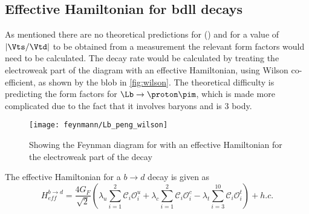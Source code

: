 
\subsection{Effective Hamiltonian for b\to dll decays} %
As mentioned there are no theoretical predictions for \BF(\Lbpi) and for a value of $|\Vts/\Vtd|$ to be obtained from a measurement the relevant form factors would need to be calculated. The decay rate would be calculated by treating the electroweak part of the diagram with an effective Hamiltonian, using Wilson co-efficient, as shown by the blob in \autoref{fig:wilson}. The theoretical difficulty is predicting the form factors for $\Lb\to\proton\pim$, which is made more complicated due to the fact that it involves baryons and is 3 body.
\begin{figure}[h!]
  \centering
  \texttt{[image: feynmann/Lb\_peng\_wilson]}
  \caption{Showing the Feynman diagram for \Lbpi with an effective Hamiltonian for the electroweak part of the decay~\cite{lowrecoil}}
  \label{fig:wilson}
    \end{figure}
The effective Hamiltonian for a $b\to d$ decay is given as
\begin{equation}
H^{b\to d}_{eff} = \frac{4G_{F}}{\sqrt{2}}(\lambda_{u}\sum^{2}_{i=1}\mathcal{C}_{i}\mathcal{O}^{u}_{i} + \lambda_{c}\sum^{2}_{i=1}\mathcal{C}_{i}\mathcal{O}^{c}_{i} - \lambda_{t}\sum^{10}_{i=3}\mathcal{C}_{i}\mathcal{O}^{t}_{i}) + h.c.
\end{equation}

